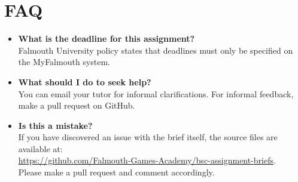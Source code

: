 \documentclass{../../fal_assignment}
\begin{document}
\section*{FAQ}

\begin{itemize}
	\item 	\textbf{What is the deadline for this assignment?} \\ 
    		Falmouth University policy states that deadlines must only be specified on the MyFalmouth system.
    		
	\item 	\textbf{What should I do to seek help?} \\ 
    		You can email your tutor for informal clarifications. For informal feedback, make a pull request on GitHub. 
    		
    	\item 	\textbf{Is this a mistake?} \\ 	
    		If you have discovered an issue with the brief itself, the source files are available at: \\
    		\url{https://github.com/Falmouth-Games-Academy/bsc-assignment-briefs}.\\
    		 Please make a pull request and comment accordingly.
\end{itemize}


%
\end{document}
